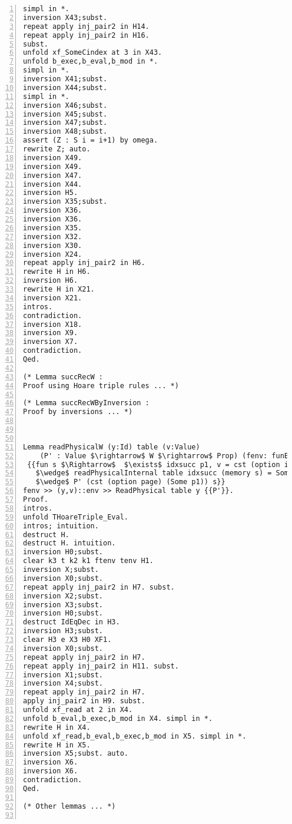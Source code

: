 \begin{appendices}
\begin{lstlisting}[xleftmargin=-.1\textwidth,
xrightmargin=-.1\textwidth,
mathescape=true,numbers=left]
simpl in *.
inversion X43;subst.
repeat apply inj_pair2 in H14.
repeat apply inj_pair2 in H16.
subst.
unfold xf_SomeCindex at 3 in X43.
unfold b_exec,b_eval,b_mod in *.
simpl in *.
inversion X41;subst.
inversion X44;subst.
simpl in *.
inversion X46;subst.
inversion X45;subst.
inversion X47;subst.
inversion X48;subst.
assert (Z : S i = i+1) by omega.
rewrite Z; auto.
inversion X49.
inversion X49.
inversion X47.
inversion X44.
inversion H5.
inversion X35;subst.
inversion X36.
inversion X36.
inversion X35.
inversion X32.
inversion X30.
inversion X24.
repeat apply inj_pair2 in H6.
rewrite H in H6.
inversion H6.
rewrite H in X21.
inversion X21.
intros.
contradiction.
inversion X18.
inversion X9.
inversion X7.
contradiction.
Qed.

(* Lemma succRecW : 
Proof using Hoare triple rules ... *)

(* Lemma succRecWByInversion : 
Proof by inversions ... *)



Lemma readPhysicalW (y:Id) table (v:Value) 
	(P' : Value $\rightarrow$ W $\rightarrow$ Prop) (fenv: funEnv) (env: valEnv) :
 {{fun s $\Rightarrow$  $\exists$ idxsucc p1, v = cst (option index) (Some idxsucc)
   $\wedge$ readPhysicalInternal table idxsucc (memory s) = Some p1 
   $\wedge$ P' (cst (option page) (Some p1)) s}} 
fenv >> (y,v)::env >> ReadPhysical table y {{P'}}.
Proof.
intros.
unfold THoareTriple_Eval.
intros; intuition.
destruct H.
destruct H. intuition.
inversion H0;subst.
clear k3 t k2 k1 ftenv tenv H1.
inversion X;subst.
inversion X0;subst.
repeat apply inj_pair2 in H7. subst.
inversion X2;subst.
inversion X3;subst.
inversion H0;subst.
destruct IdEqDec in H3.
inversion H3;subst.
clear H3 e X3 H0 XF1. 
inversion X0;subst.
repeat apply inj_pair2 in H7.
repeat apply inj_pair2 in H11. subst.
inversion X1;subst.
inversion X4;subst.
repeat apply inj_pair2 in H7.
apply inj_pair2 in H9. subst.
unfold xf_read at 2 in X4.
unfold b_eval,b_exec,b_mod in X4. simpl in *.
rewrite H in X4.
unfold xf_read,b_eval,b_exec,b_mod in X5. simpl in *.
rewrite H in X5.
inversion X5;subst. auto.
inversion X6.
inversion X6.
contradiction.
Qed.

(* Other lemmas ... *)


\end{lstlisting}
\end{appendices}
